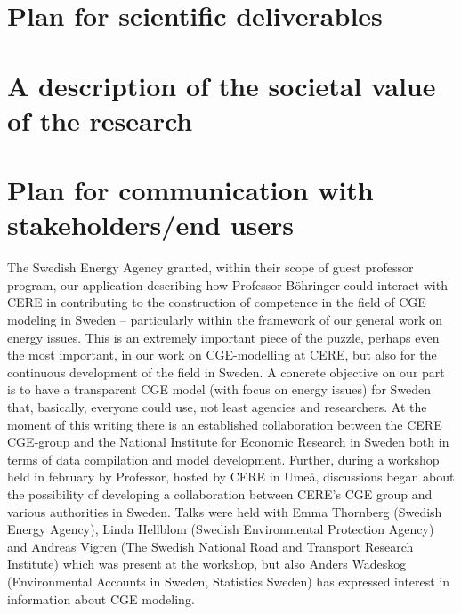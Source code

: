\section{Plan for scientific deliverables}

\section{A description of the societal value of the research}
\section{Plan for communication with stakeholders/end users}
The Swedish Energy Agency granted, within their scope of guest professor program, our application describing how Professor Böhringer could interact with CERE in contributing to the construction of competence in the field of CGE modeling in Sweden – particularly within the framework of our general work on energy issues. This is an extremely important piece of the puzzle, perhaps even the most important, in our work on CGE-modelling at CERE, but also for the continuous development of the field in Sweden. 
A concrete objective on our part is to have a transparent CGE model (with focus on energy issues) for Sweden that, basically, everyone could use, not least agencies and researchers. At the moment of this writing there is an established collaboration between the CERE  CGE-group and the National Institute for Economic Research in Sweden both in terms of data compilation and model development. Further, during a workshop held in february by Professor, hosted by CERE in Umeå, discussions began about the possibility of developing a collaboration between CERE's CGE group and various authorities in Sweden. Talks were held with Emma Thornberg (Swedish Energy Agency), Linda Hellblom (Swedish Environmental Protection Agency) and Andreas Vigren (The Swedish National Road and Transport Research Institute) which was present at the workshop, but also Anders Wadeskog (Environmental Accounts in Sweden, Statistics Sweden) has expressed interest in information about CGE modeling.
